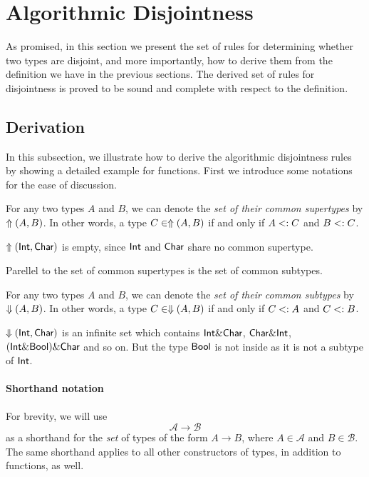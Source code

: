 \section{Algorithmic Disjointness}

As promised, in this section we present the set of rules for determining whether
two types are disjoint, and more importantly, how to derive them from the
definition we have in the previous sections. The derived set of rules for
disjointness is proved to be sound and complete with respect to the definition.

\subsection{Derivation}

In this subsection, we illustrate how to derive the algorithmic disjointness
rules by showing a detailed example for functions. First we introduce some
notations for the ease of discussion.

\begin{definition}
  For any two types $A$ and $B$, we can denote the \emph{set of their common
  supertypes} by $\Uparrow(A,B)$. In other words, a type $C \in
  \Uparrow(A,B)$ if and only  if $A <: C$ and $B <: C$.
\end{definition}

\begin{example}
  $\Uparrow(\textsf{Int},\textsf{Char})$ is empty, since $\textsf{Int}$ and $\textsf{Char}$
  share no common supertype.
\end{example}

Parellel to the set of common supertypes is the set of common subtypes.

\begin{definition}
  For any two types $A$ and $B$, we can denote the \emph{set of their common
  subtypes} by $\Downarrow(A,B)$. In other words, a type $C \in \Downarrow(A,B)$
  if and only  if $C <: A$ and $C <: B$.
\end{definition}

\begin{example}
  $\Downarrow(\textsf{Int},\textsf{Char})$ is an infinite set which contains $\textsf{Int} \&
  \textsf{Char}$, $\textsf{Char} \& \textsf{Int}$, $(\textsf{Int} \& \textsf{Bool}) \& \textsf{Char}$
  and so on. But the type $\textsf{Bool}$ is not inside as it is not a subtype of
  $\textsf{Int}$.
\end{example}

\paragraph{Shorthand notation} For brevity, we will use \[ \mathcal{A} \to
\mathcal{B} \] as a shorthand for the \emph{set} of types of the form $A \to B$,
where $A \in \mathcal{A}$ and $B \in \mathcal{B}$. The same shorthand applies to
all other constructors of types, in addition to functions, as well.

